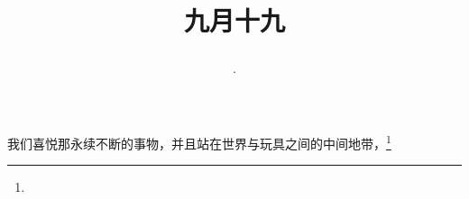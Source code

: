 \title{\date[d=21,m=10,y=2024][year:cn-y,年,month:cn,day:cn,日,·,weekday]·九月十九 }
我们喜悦那永续不断的事物，并且站在世界与玩具之间的中间地带，\footnote{ }

